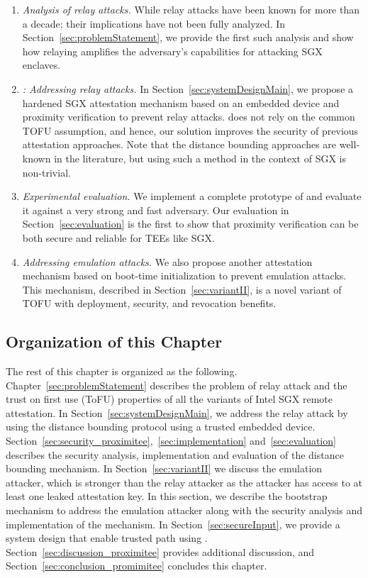 \begin{enumerate}
    \item \emph{Analysis of relay attacks.} While relay attacks have been known for more than a decade; their implications have not been fully analyzed. In Section~\ref{sec:problemStatement}, we provide the first such analysis and show how relaying amplifies the adversary's capabilities for attacking SGX enclaves.   

    \item \emph{\name: Addressing relay attacks.} In Section~\ref{sec:systemDesignMain}, we propose a hardened SGX attestation mechanism based on an embedded device and proximity verification to prevent relay attacks. \name does not rely on the common TOFU assumption, and hence, our solution improves the security of previous attestation approaches. Note that the distance bounding approaches are well-known in the literature, but using such a method in the context of SGX is non-trivial.
    
    \item \emph{Experimental evaluation.} We implement a complete prototype of \name and evaluate it against a very strong and fast adversary. Our evaluation in Section~\ref{sec:evaluation} is the first to show that proximity verification can be both secure and reliable for TEEs like SGX.
    
    \item \emph{Addressing emulation attacks.} We also propose another attestation mechanism based on boot-time initialization to prevent emulation attacks. This mechanism, described in Section~\ref{sec:variantII}, is a novel variant of TOFU with deployment, security, and revocation benefits.
\end{enumerate}

\subsection{Organization of this Chapter}

The rest of this chapter is organized as the following. Chapter~\ref{sec:problemStatement} describes the problem of relay attack and the trust on first use (ToFU) properties of all the variants of Intel SGX remote attestation. In Section~\ref{sec:systemDesignMain}, we address the relay attack by using the distance bounding protocol using a trusted embedded device. Section~\ref{sec:security_proximitee},~\ref{sec:implementation} and~\ref{sec:evaluation} describes the security analysis, implementation and evaluation of the distance bounding mechanism. In Section~\ref{sec:variantII} we discuss the emulation attacker, which is stronger than the relay attacker as the attacker has access to at least one leaked attestation key. In this section, we describe the bootstrap mechanism to address the emulation attacker along with the security analysis and implementation of the mechanism. In Section~\ref{sec:secureInput}, we provide a system design that enable trusted path using \proximitee. Section~\ref{sec:discussion_proximitee} provides additional discussion, and Section~\ref{sec:conclusion_promimitee} concludes this chapter.



